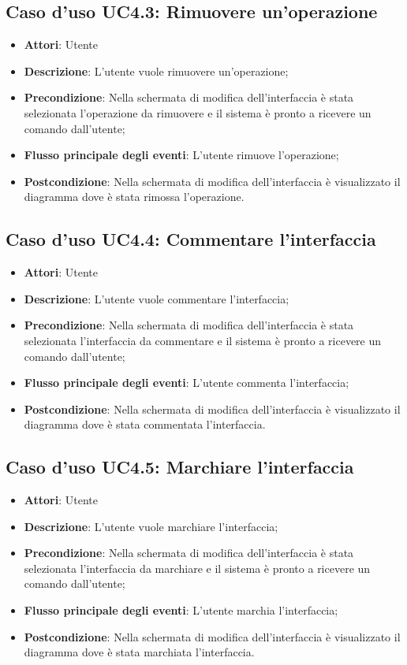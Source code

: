 \documentclass[../AnalisiDeiRequisiti.tex]{subfiles}
\begin{document}
			\subsection{Caso d'uso UC4.3: Rimuovere un'operazione}
			\begin{itemize}
				\item \textbf{Attori}: Utente
				\item \textbf{Descrizione}: L'utente vuole rimuovere un'operazione;
				\item \textbf{Precondizione}: Nella schermata di modifica dell'interfaccia è stata selezionata l'operazione da rimuovere e il sistema è pronto a ricevere un comando dall'utente;
				\item \textbf{Flusso principale degli eventi}: L'utente rimuove l'operazione;
				\item \textbf{Postcondizione}: Nella schermata di modifica dell'interfaccia è visualizzato il diagramma dove è stata rimossa l'operazione.
			\end{itemize}
			\subsection{Caso d'uso UC4.4: Commentare l'interfaccia}
			\begin{itemize}
				\item \textbf{Attori}: Utente
				\item \textbf{Descrizione}: L'utente vuole commentare l'interfaccia;
				\item \textbf{Precondizione}: Nella schermata di modifica dell'interfaccia è stata selezionata l'interfaccia da commentare e il sistema è pronto a ricevere un comando dall'utente;
				\item \textbf{Flusso principale degli eventi}: L'utente commenta l'interfaccia;
				\item \textbf{Postcondizione}: Nella schermata di modifica dell'interfaccia è visualizzato il diagramma dove è stata commentata l'interfaccia.
			\end{itemize}
			\subsection{Caso d'uso UC4.5: Marchiare l'interfaccia}
			\begin{itemize}
				\item \textbf{Attori}: Utente
				\item \textbf{Descrizione}: L'utente vuole marchiare l'interfaccia;
				\item \textbf{Precondizione}: Nella schermata di modifica dell'interfaccia è stata selezionata l'interfaccia da marchiare e il sistema è pronto a ricevere un comando dall'utente;
				\item \textbf{Flusso principale degli eventi}: L'utente marchia l'interfaccia;
				\item \textbf{Postcondizione}: Nella schermata di modifica dell'interfaccia è visualizzato il diagramma dove è stata marchiata l'interfaccia.
			\end{itemize}
\end{document}
